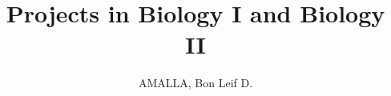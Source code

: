 \documentclass[12pt]{report}
\begin{document}
\author{AMALLA, Bon Leif D.}
\title{Projects in Biology I and Biology II}
\maketitle
\newpage

% 
% 
% 
% 
% 
% 
% 
% 




\singlespacing


\end{document}
